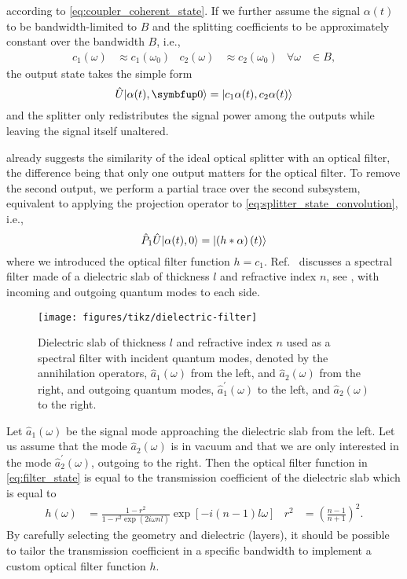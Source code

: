 according to \cref{eq:coupler_coherent_state}.
If we further assume the signal $\alpha(t)$ to be bandwidth-limited to $B$ and the splitting coefficients to be approximately constant over the bandwidth $B$, i.e.,
\begin{align}
	c_1(\omega)
	&\approx
	c_1(\omega_0)
	&
	c_2(\omega)
	&\approx
	c_2(\omega_0)
	&
	\forall
	\omega
	&\in
	B
	,
\end{align}
the output state takes the simple form
\begin{equation}
	\hat{U}
	\ket*{\alpha(t),\vb{0}}
	=
	\ket*{c_1\alpha(t),c_2\alpha(t)}
\end{equation}
and the splitter only redistributes the signal power among the outputs while leaving the signal itself unaltered.

 already suggests the similarity of the ideal optical splitter with an optical filter, the difference being that only one output matters for the optical filter.
To remove the second output, we perform a partial trace over the second subsystem, equivalent to applying the projection operator to \cref{eq:splitter_state_convolution}, i.e.,
\begin{equation}
	\hat{P}_1
	\hat{U}
	\ket*{\alpha(t),0}
	=
	\ket*{\left(h\conv\alpha\right)(t)}
	\label{eq:filter_state}
\end{equation}
where we introduced the optical filter function $h=c_1$.
Ref.~\cite[p.~199]{Vogel2006} discusses a spectral filter made of a dielectric slab of thickness $l$ and refractive index $n$, see , with incoming and outgoing quantum modes to each side.
\begin{figure}[htb]
    \centering
    \texttt{[image: figures/tikz/dielectric-filter]}
    \caption{Dielectric slab of thickness $l$ and refractive index $n$ used as a spectral filter with incident quantum modes, denoted by the annihilation operators, $\hat{a}_1(\omega)$ from the left, and $\hat{a}_2(\omega)$ from the right, and outgoing quantum modes, $\hat{a}_1^\prime(\omega)$ to the left, and $\hat{a}_2(\omega)$ to the right.}\label{fig:dielectric_filter}
\end{figure}
Let $\hat{a}_1(\omega)$ be the signal mode approaching the dielectric slab from the left.
Let us assume that the mode $\hat{a}_2(\omega)$ is in vacuum and that we are only interested in the mode $\hat{a}_2^\prime(\omega)$, outgoing to the right.
Then the optical filter function in \cref{eq:filter_state} is equal to the transmission coefficient of the dielectric slab which is equal to~\cite[p.~199]{Vogel2006}
\begin{align}
	h(\omega)
	&=
	\frac{1-r^2}{1-r^2\exp(2i\omega nl)}
	\exp\left[-i(n-1)l\omega\right]
	&
	r^2
	&=
	\left(\frac{n-1}{n+1}\right)^2
	.
\end{align}
By carefully selecting the geometry and dielectric (layers), it should be possible to tailor the transmission coefficient in a specific bandwidth to implement a custom optical filter function $h$.